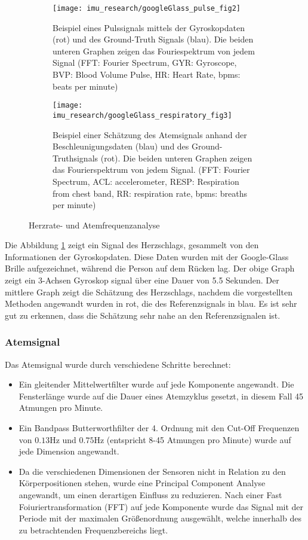 \begin{figure}[ht]
    \centering
    \begin{subfigure}{.49\textwidth}
        \texttt{[image: imu\_research/googleGlass\_pulse\_fig2]}
      \caption{Beispiel eines Pulssignals mittels der Gyroskopdaten (rot) und des Ground-Truth Signals (blau). Die beiden unteren Graphen zeigen das Fouriespektrum von jedem Signal (FFT: Fourier Spectrum, GYR: Gyroscope, BVP: Blood Volume Pulse, HR: Heart Rate, bpms: beats per minute)}
      \label{background:googleGlass:pulse_wave}
    \end{subfigure}
    \begin{subfigure}{.49\textwidth}
        \texttt{[image: imu\_research/googleGlass\_respiratory\_fig3]}
      \caption{Beispiel einer Schätzung des Atemsignals anhand der Beschleunigungsdaten (blau) und des Ground-Truthsignals (rot). Die beiden unteren Graphen zeigen das Fourierspektrum von jedem Signal. (FFT: Fourier Spectrum, ACL: accelerometer, RESP: Respiration from chest band, RR: respiration rate, bpms: breaths per minute)}
      \label{background:googleGlass:respiratory_wave}
    \end{subfigure}
    \caption{Herzrate- und Atemfrequenzanalyse}
    \label{background:googleGlass}
  \end{figure}

Die Abbildung \ref{background:googleGlass:pulse_wave} zeigt ein Signal des Herzschlags, gesammelt von den Informationen der Gyroskopdaten. Diese Daten wurden mit der Google-Glass Brille aufgezeichnet, während die Person auf dem Rücken lag. Der obige Graph zeigt ein 3-Achsen Gyroskop signal über eine Dauer von 5.5 Sekunden. Der mittlere Graph zeigt die Schätzung des Herzschlags, nachdem die vorgestellten Methoden angewandt wurden in rot, die des Referenzsignals in blau. Es ist sehr gut zu erkennen, dass die Schätzung sehr nahe an den Referenzsignalen ist.

\newpage

\subsubsection{Atemsignal}
Das Atemsignal wurde durch verschiedene Schritte berechnet:
\begin{itemize}
    \item Ein gleitender Mittelwertfilter wurde auf jede Komponente angewandt. Die Fensterlänge wurde auf die Dauer eines Atemzyklus gesetzt, in diesem Fall 45 Atmungen pro Minute. 
    \item Ein Bandpass Butterworthfilter der 4. Ordnung mit den Cut-Off Frequenzen von $0.13 \si{\hertz}$ und $0.75 \si{\hertz}$ (entspricht 8-45 Atmungen pro Minute) wurde auf jede Dimension angewandt.
    \item Da die verschiedenen Dimensionen der Sensoren nicht in Relation zu den Körperpositionen stehen, wurde eine Principal Component Analyse angewandt, um einen derartigen Einfluss zu reduzieren. Nach einer Fast Foiuriertransformation (FFT) auf jede Komponente wurde das Signal mit der Periode mit der maximalen Größenordnung ausgewählt, welche innerhalb des zu betrachtenden Frequenzbereichs liegt.
\end{itemize}

